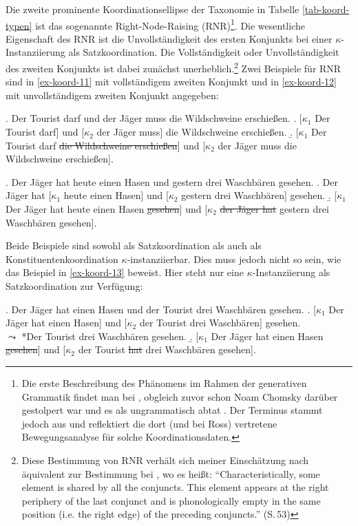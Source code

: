 Die zweite prominente Koordinationsellipse der Taxonomie in Tabelle \ref{tab-koord-typen} ist das sogenannte Right-Node-Raising (RNR)\footnote{Die erste Beschreibung des Phänomens im Rahmen der generativen Grammatik findet man bei \citet[174ff]{Ross:67}, obgleich zuvor schon Noam Chomsky darüber gestolpert war und es als ungrammatisch abtat \cite[35, Fußnote 2]{Chomsky:57}. Der Terminus stammt jedoch aus \cite{Postal:74} und reflektiert die dort (und bei Ross) vertretene Bewegungsanalyse für solche Koordinationsdaten.}. Die wesentliche Eigenschaft des RNR ist die Unvollständigkeit des ersten Konjunkts bei einer $\kappa$-Instanziierung als Satzkoordination. Die Vollständigkeit oder Unvollständigkeit des zweiten Konjunkts ist dabei zunächst unerheblich.\footnote{Diese Bestimmung von RNR verhält sich meiner Einschätzung nach äquivalent zur Bestimmung bei \cite{Hartmann:00}, wo es hei\ss t: "`Characteristically, some element is shared by all the conjuncts. This element appears at the right periphery of the last conjunct and is phonologically empty in the same position (i.e. the right edge) of the preceding conjuncts."' (S.\,53)} Zwei Beispiele für RNR sind in \ref{ex-koord-11} mit vollständigem zweiten Konjunkt und in \ref{ex-koord-12} mit unvollständigem zweiten Konjunkt angegeben: 

\exi. \label{ex-koord-11} Der Tourist darf und der J\"ager muss die Wildschweine erschie\ss en.
\a. [$\kappa_1$ Der Tourist darf] und [$\kappa_2$ der J\"ager muss] die Wildschweine erschie\ss en.
\b. [$\kappa_1$ Der Tourist darf \sout{die Wildschweine erschie\ss en}] und [$\kappa_2$ der J\"ager muss die Wildschweine erschie\ss en].

\exi. \label{ex-koord-12} Der J\"ager hat heute einen Hasen und gestern drei Waschb\"aren gesehen.
\a. Der J\"ager hat [$\kappa_1$ heute einen Hasen] und [$\kappa_2$ gestern drei Waschb\"aren] gesehen.
\b. [$\kappa_1$ Der J\"ager hat heute einen Hasen \sout{gesehen}] und [$\kappa_2$ \sout{der Jäger hat}  gestern drei Waschb\"aren gesehen].

Beide Beispiele sind sowohl als Satzkoordination als auch als Konstituentenkoordination $\kappa$-instanziierbar. Dies muss jedoch nicht so sein, wie das Beispiel in \ref{ex-koord-13} beweist. Hier steht nur eine $\kappa$-Instanziierung als Satzkoordination zur Verfügung: 

\ex. \label{ex-koord-13}Der Jäger hat einen Hasen und der Tourist drei Waschbären gesehen.
\a. [$\kappa_1$ Der Jäger hat einen Hasen] und [$\kappa_2$ der Tourist drei Waschbären] gesehen. \\
$\leadsto$ *Der Tourist drei Waschbären gesehen.
\b. [$\kappa_1$ Der Jäger hat einen Hasen \sout{gesehen}] und [$\kappa_2$ der Tourist \sout{hat} drei Waschbären gesehen].

